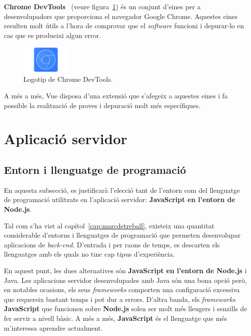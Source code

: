 \documentclass[a4paper,12pt]{ThesisStyle}
\begin{document}
\textbf{Chrome DevTools}~\cite{ChromeDevTools} (veure figura~\ref{img:logo_chrome_dev_tools}) és un conjunt d'eines per a desenvolupadors que proporciona el navegador Google Chrome. Aquestes eines resulten molt útils a l'hora de comprovar que el \textit{software} funcioni i depurar-lo en cas que es produeixi algun error.

\begin{figure}[H]
  \centering
  \includegraphics[width=0.22\textwidth]{assets/logos/ChromeDevTools.png}
  \caption{\label{img:logo_chrome_dev_tools}Logotip de Chrome DevTools.}
\end{figure}

A més a més, Vue disposa d'una extensió que s'afegeix a aquestes eines i fa possible la realització de proves i depuració molt més específiques.

\section{Aplicació servidor}
\label{sec:decisions_servidor}

\subsection{Entorn i llenguatge de programació}
\label{subsec:decisions_servidor_entorn}
En aquesta subsecció, es justificarà l'elecció tant de l'entorn com del llenguatge de programació utilitzats en l'aplicació servidor: \textbf{JavaScript en l'entorn de Node.js}.

Tal com s'ha vist al capítol~\ref{cap:marcdetreball}, existeix una quantitat considerable d'entorns i llenguatges de programació que permeten desenvolupar aplicacions de \textit{back-end}. D'entrada i per raons de temps, es descarten els llenguatges amb els quals no tinc cap tipus d'experiència.

En aquest punt, les dues alternatives són \textbf{JavaScript en l'entorn de Node.js} i Java. Les aplicacions servidor desenvolupades amb Java són una bona opció però, en notables ocasions, els seus \textit{frameworks} comporten una configuració excessiva que requereix bastant temps i pot dur a errors. D'altra banda, els \textit{frameworks} \textbf{JavaScript} que funcionen sobre \textbf{Node.js} solen ser molt més lleugers i senzills de fer servir a nivell bàsic. A més a més, \textbf{JavaScript} és el llenguatge que més m'interessa aprendre actualment.
\end{document}
